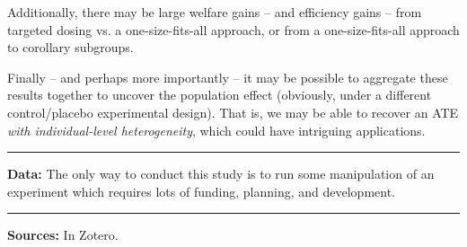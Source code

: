 \documentclass[12pt,letterpaper,doublespace, oneside]{article}
\begin{document}
Additionally, there may be large welfare gains -- and efficiency gains -- from targeted dosing vs. a one-size-fits-all approach, or from a one-size-fits-all approach to corollary subgroups. 

Finally -- and perhaps more importantly -- it may be possible to aggregate these results together to uncover the population effect (obviously, under a different control/placebo experimental design). That is, we may be able to recover an ATE \emph{with individual-level heterogeneity}, which could have intriguing applications. 

\noindent\rule{\linewidth}{0.4pt}

\noindent
\textbf{Data:} The only way to conduct this study is to run some manipulation of an experiment which requires lots of funding, planning, and development. 

\noindent\rule{\linewidth}{0.4pt}

\noindent
\textbf{Sources:} In Zotero.













%
%
\end{document}
